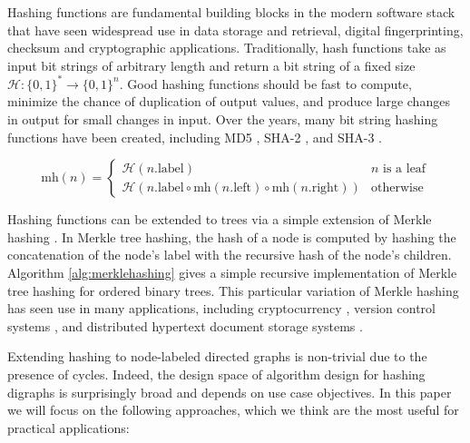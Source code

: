 \documentclass{svproc}
\begin{document}
Hashing functions are fundamental building blocks in the modern software stack that have seen widespread use in data storage and retrieval, digital fingerprinting, checksum and cryptographic applications. Traditionally, hash functions take as input bit strings of arbitrary length and return a bit string of a fixed size $\mathcal{H} : \{0,1\}^* \rightarrow \{0,1\}^n$. Good hashing functions should be fast to compute, minimize the chance of duplication of output values, and produce large changes in output for small changes in input. Over the years, many bit string hashing functions have been created, including MD5 \cite{md5}, SHA-2 \cite{sha2}, and SHA-3 \cite{sha3}.

\begin{algorithm}
\caption{Recursive Merkle-tree Hashing of Ordered Binary Tree}
\[
\text{mh}(n) =
\begin{cases} 
    \mathcal{H}(n.\text{label}) & n \text{ is a leaf} \\
    \mathcal{H}(n.\text{label} \circ \text{mh}(n.\text{left}) \circ \text{mh}(n.\text{right})) & \text{otherwise}
\end{cases}
\]
\label{alg:merklehashing}
\end{algorithm}

Hashing functions can be extended to trees via a simple extension of Merkle hashing \cite{merkle1987digital}. In Merkle tree hashing, the hash of a node is computed by hashing the concatenation of the node's label with the recursive hash of the node's children. Algorithm \ref{alg:merklehashing} gives a simple recursive implementation of Merkle tree hashing for ordered binary trees. This particular variation of Merkle hashing has seen use in many applications, including cryptocurrency \cite{bitcoin}, version control systems \cite{git}, and distributed hypertext document storage systems \cite{ipfs}.

Extending hashing to node-labeled directed graphs is non-trivial due to the presence of cycles. Indeed, the design space of algorithm design for hashing digraphs is surprisingly broad and depends on use case objectives. In this paper we will focus on the following approaches, which we think are the most useful for practical applications:
\end{document}
